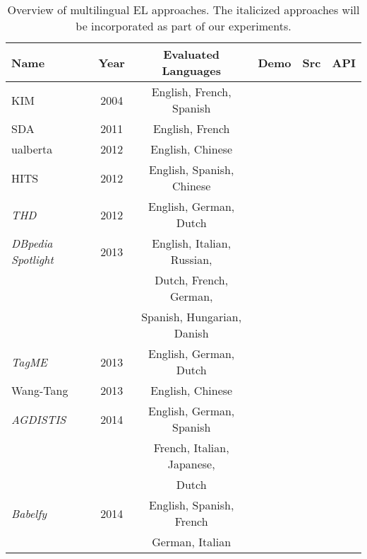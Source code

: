 \documentclass{llncs}
\newcommand{\cmark}{\ding{51}}%
\newcommand{\xmark}{\ding{55}}%
\begin{document}
\begin{table*}[th!]
\centering
\caption{Overview of multilingual EL approaches. The italicized approaches will be incorporated as part of our experiments.}
\label{tab:multilingual_approaches}
\setlength{\tabcolsep}{3pt}
\begin{tabular}{lccccr}
\toprule
\textbf{Name} &  \textbf{Year} & \textbf{Evaluated Languages} & \textbf{Demo} & \textbf{Src} & \textbf{API}\\ \midrule

KIM \cite{KIM-popov2004kim} & 2004 &English, French, Spanish&\cmark&\xmark&\cmark\\\midrule

SDA \cite{SDA-charton2011automatic}  & 2011 &English, French&\xmark&\xmark&\xmark\\\midrule

ualberta \cite{guo2012ualberta}& 2012 &English, Chinese&\xmark&\xmark&\xmark\\\midrule

HITS \cite{fahrni2012hits} & 2012 & English, Spanish, Chinese&\xmark&\xmark&\xmark\\\midrule

\textit{THD} \cite{THD-dojchinovski2012recognizing}  & 2012 &English, German, Dutch&\cmark&\cmark&\cmark\\\midrule 

\textit{DBpedia Spotlight} \cite{mendes2011dbpedia,daiber2013improving} & 2013  &English, Italian, Russian,&\cmark&\cmark&\cmark\\
& &Dutch, French, German,&&&\\
& &Spanish, Hungarian, Danish&&&\\\midrule

\textit{TagME} \cite{ferragina2010tagme} & 2013 & English, German, Dutch &\cmark&\xmark&\cmark\\\midrule

Wang-Tang \cite{wang2013boosting} & 2013 & English, Chinese&\xmark&\xmark&\xmark\\\midrule

\textit{AGDISTIS} \cite{usbeck2014agdistis,mag2017}& 2014 & English, German, Spanish&\cmark&\cmark&\cmark\\
& &French, Italian, Japanese,&&&\\
& &Dutch&&&\\\midrule

\textit{Babelfy} \cite{Babelfy-moro2014entity}& 2014 &English, Spanish, French &\cmark&\xmark&\cmark\\
& &German, Italian&&&\\\midrule


\end{tabular}
\end{table*}
\end{document}
